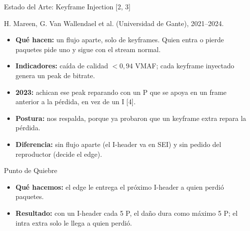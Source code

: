 \documentclass[aspectratio=169, 12pt]{beamer}
\newcommand{\secuencia}[5]{%
  \node[anchor=east, font=\scriptsize] at (-0.2, #1+0.17) {#5};
  \pgfmathtruncatemacro{\proxI}{#4 < 0 ? -1 : (floor(#4/#2)+1)*#2}%
  \pgfmathtruncatemacro{\proxH}{#4 < 0 ? -1 : (#3 == 1 ? min((floor(#4/6)+1)*6, \proxI) : \proxI)}%
  \foreach \i in {0,...,90}{%
    \pgfmathtruncatemacro{\esI}{mod(\i,#2) == 0 ? 1 : 0}%
    \pgfmathtruncatemacro{\estado}{\esI == 1 ? 1 : ((#4 >= 0 && \i >= #4 && \i < \proxH) ? 2 : ((#4 >= 0 && \i >= \proxH && \i < \proxI) ? 3 : 0))}%
    \ifcase\estado \def\col{Suave}\or \def\col{SentricaBlue}\or \def\col{Rojo}\or \def\col{Rojo!25}\fi
    \fill[\col] (\i*0.115, #1) rectangle ++(0.1, 0.34);
  }%
  \ifnum#3=1
    \foreach \k in {6,12,...,90}{%
      \pgfmathtruncatemacro{\esI}{mod(\k,#2) == 0 ? 1 : 0}%
      \ifnum\esI=0 \fill[SentricaBlue] (\k*0.115+0.05, #1+0.42) circle (0.04);\fi
    }%
  \fi
  \ifnum#4>-1 \node[font=\tiny] at (#4*0.115+0.05, #1+0.5) {$\blacktriangledown$};\fi
}
\newcommand{\ejetiempo}[1]{%
  \foreach \s/\f in {0/0, 1/30, 2/60, 3/90}{\node[font=\tiny, text=gray] at (\f*0.115+0.05, #1) {\s\,s};}
}
\begin{document}
\begin{frame}{Estado del Arte: Keyframe Injection [2, 3]}
    {\scriptsize\color{gray} H. Mareen, G. Van Wallendael et al. (Universidad de Gante), 2021--2024.\par}
    \vspace{0.1cm}
    \begin{itemize}
        \item \textbf{Qué hacen:} un flujo aparte, solo de keyframes. Quien entra o pierde paquetes pide uno y sigue con el stream normal.
        \item \textbf{Indicadores:} caída de calidad $<0{,}94$ VMAF; cada keyframe inyectado genera un peak de bitrate.
        \item \textbf{2023:} achican ese peak reparando con un P que se apoya en un frame anterior a la pérdida, en vez de un I [4].
        \item \textbf{Postura:} nos respalda, porque ya probaron que un keyframe extra repara la pérdida.
        \item \textbf{Diferencia:} sin flujo aparte (el I-header va en SEI) y sin pedido del reproductor (decide el edge).
    \end{itemize}
\end{frame}

\begin{frame}{Punto de Quiebre}
    \begin{itemize}
        \item \textbf{Qué hacemos:} el edge le entrega el próximo I-header a quien perdió paquetes.
        \item \textbf{Resultado:} con un I-header cada 5 P, el daño dura como máximo 5 P; el intra extra solo le llega a quien perdió.
    \end{itemize}

    \vspace{0.15cm}
    \centering
\end{frame}
\end{document}
